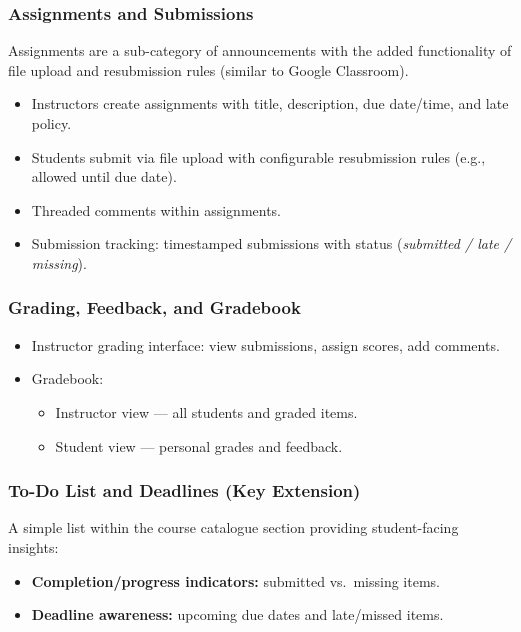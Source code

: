 \documentclass[11pt, legalpaper]{article}
\begin{document}
\subsubsection{Assignments and Submissions}
Assignments are a sub-category of announcements with the added functionality
of file upload and resubmission rules (similar to Google Classroom).
\begin{itemize}
  \item Instructors create assignments with title, description, due date/time,
        and late policy.
  \item Students submit via file upload with configurable resubmission rules
        (e.g., allowed until due date).
  \item Threaded comments within assignments.
  \item Submission tracking: timestamped submissions with status
        (\emph{submitted / late / missing}).
\end{itemize}

\subsubsection{Grading, Feedback, and Gradebook}
\begin{itemize}
  \item Instructor grading interface: view submissions, assign scores, add
        comments.
  \item Gradebook:
    \begin{itemize}
      \item Instructor view — all students and graded items.
      \item Student view — personal grades and feedback.
    \end{itemize}
\end{itemize}

\subsubsection{To-Do List and Deadlines \texorpdfstring{\normalfont\small(Key Extension)}{}}
A simple list within the course catalogue section providing student-facing
insights:
\begin{itemize}
  \item \textbf{Completion/progress indicators:} submitted vs.\ missing items.
  \item \textbf{Deadline awareness:} upcoming due dates and late/missed items.
\end{itemize}
\end{document}
